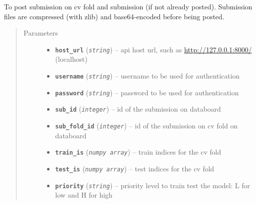 \documentclass[letterpaper,10pt,english]{sphinxmanual}
\begin{document}
\begin{fulllineitems}
\label{modules/views:test_files.post_api.post_submission_fold}
To post submission on cv fold and submission (if not already posted).    Submission files are compressed (with zlib) and base64-encoded before being    posted.
\begin{quote}\begin{description}
\item[{Parameters}] \leavevmode\begin{itemize}
\item {} 
\textbf{\texttt{host\_url}} (\emph{\texttt{string}}) -- api host url, such as \url{http://127.0.0.1:8000/} (localhost)

\item {} 
\textbf{\texttt{username}} (\emph{\texttt{string}}) -- username to be used for authentication

\item {} 
\textbf{\texttt{password}} (\emph{\texttt{string}}) -- password to be used for authentication

\item {} 
\textbf{\texttt{sub\_id}} (\emph{\texttt{integer}}) -- id of the submission on databoard

\item {} 
\textbf{\texttt{sub\_fold\_id}} (\emph{\texttt{integer}}) -- id of the submission on cv fold on databoard

\item {} 
\textbf{\texttt{train\_is}} (\emph{\texttt{numpy array}}) -- train indices for the cv fold

\item {} 
\textbf{\texttt{test\_is}} (\emph{\texttt{numpy array}}) -- test indices for the cv fold

\item {} 
\textbf{\texttt{priority}} (\emph{\texttt{string}}) -- priority level to train test the model: L for low    and H for high

\end{itemize}

\end{description}\end{quote}

\end{fulllineitems}
\end{document}
